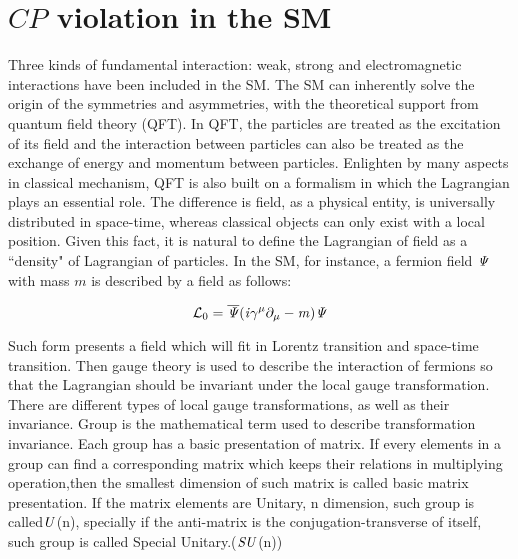 \section{$CP$ violation in the SM}
Three kinds of fundamental interaction: weak, strong and electromagnetic interactions have been included in the SM. The SM can inherently solve the origin of the symmetries and asymmetries, with the theoretical support from quantum field theory (QFT). In QFT, the particles are treated as the excitation of its field and the interaction between particles can also be treated as the exchange of energy and momentum between particles. Enlighten by many aspects in classical mechanism, QFT is also built on a formalism in which the Lagrangian plays an essential role. The difference is field, as a physical entity, is universally distributed in space-time, whereas classical objects can only exist with a local position. Given this fact, it is natural to define the Lagrangian of field as a ``density" of Lagrangian of particles. In the SM, for instance, a fermion field $\it{\Psi}$ with mass $m$ is described by a field as follows:

\begin{equation}
\mathcal{L}_0 = \it{\overline{\Psi}(i\gamma^\mu \partial_\mu-m)\Psi}
\end{equation} 

Such form presents a field which will fit in Lorentz transition and space-time transition. Then gauge theory is used to describe the interaction of fermions so that the Lagrangian should be invariant under the local gauge transformation. There are different types of local gauge transformations, as well as their invariance. 
Group is the mathematical term used to describe transformation invariance. Each group has a basic presentation of matrix. If every elements in a group can find a corresponding matrix which keeps their relations in multiplying operation,then the smallest dimension of such matrix is called basic matrix presentation. If the matrix elements are Unitary, n dimension, such group is called$\it{U}$(n), 
specially if the anti-matrix is the conjugation-transverse of itself, such group is called Special Unitary.($\it{SU}$(n)) 


